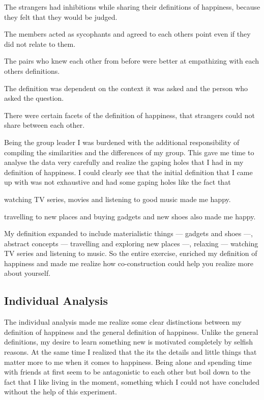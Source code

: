 \documentclass[twoside]{article}
\begin{document}
\begin{multicols}{2}
\begin{compactitem}
\item The strangers had inhibitions while sharing their definitions of happiness, because they felt 
    that they would be judged.
\item The members acted as sycophants and agreed to each others point even if they did not relate to them.
\item The pairs who knew each other from before were better at empathizing with each others definitions.
\item The definition was dependent on the context it was asked and the person who asked the question.
\item There were certain facets of the definition of happiness, that strangers could not share between each other.
\end{compactitem}

Being the group leader I was burdened with the additional responsibility of compiling the similarities and the
differences of my group. This gave me time to analyse the data very carefully and realize the gaping holes that
I had in my definition of happiness. I could clearly see that the initial definition that I came up with was 
not exhaustive and had some gaping holes like the fact that

\begin{compactitem}
\item watching TV series, movies and listening to good music made me happy.
\item travelling to new places and buying gadgets and new shoes also made me happy.
\end{compactitem}

My definition expanded to include materialistic things --- gadgets and shoes ---, abstract concepts --- travelling
and exploring new places ---, relaxing --- watching TV series and listening to music. So the entire exercise,
enriched my definition of happiness and made me realize how co-construction could help you realize more about 
yourself.

\subsection{Individual Analysis}
The individual analysis made me realize some clear distinctions between my definition of happiness and the 
general definition of happiness. Unlike the general definitions, my desire to learn something new is 
motivated completely by selfish reasons. At the same time I realized that the its the details and little 
things that matter more to me when it comes to happiness. Being alone and spending time with friends at
first seem to be antagonistic to each other but boil down to the fact that I like living in the moment, 
something which I could not have concluded without the help of this experiment.


\end{multicols}
\end{document}
